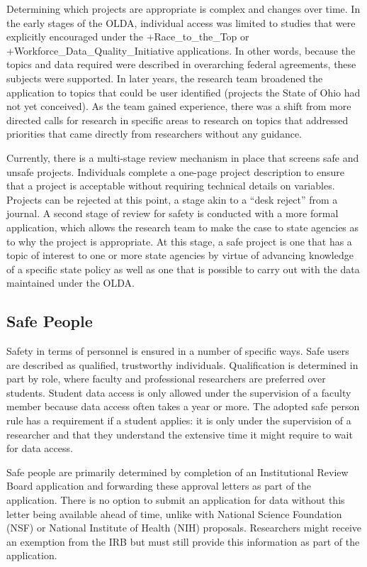 \documentclass[
]{book}
\begin{document}
Determining which projects are appropriate is complex and changes over time. In the early stages of the OLDA, individual access was limited to studies that were explicitly encouraged under the +Race\_to\_the\_Top\textbar{} or +Workforce\_Data\_Quality\_Initiative\textbar{} applications. In other words, because the topics and data required were described in overarching federal agreements, these subjects were supported. In later years, the research team broadened the application to topics that could be user identified (projects the State of Ohio had not yet conceived). As the team gained experience, there was a shift from more directed calls for research in specific areas to research on topics that addressed priorities that came directly from researchers without any guidance.

Currently, there is a multi-stage review mechanism in place that screens safe and unsafe projects. Individuals complete a one-page project description to ensure that a project is acceptable without requiring technical details on variables. Projects can be rejected at this point, a stage akin to a ``desk reject'' from a journal. A second stage of review for safety is conducted with a more formal application, which allows the research team to make the case to state agencies as to why the project is appropriate. At this stage, a safe project is one that has a topic of interest to one or more state agencies by virtue of advancing knowledge of a specific state policy as well as one that is possible to carry out with the data maintained under the OLDA.

\hypertarget{safe-people-1}{%
\subsection{Safe People}\label{safe-people-1}}

Safety in terms of personnel is ensured in a number of specific ways. Safe users are described as qualified, trustworthy individuals. Qualification is determined in part by role, where faculty and professional researchers are preferred over students. Student data access is only allowed under the supervision of a faculty member because data access often takes a year or more. The adopted safe person rule has a requirement if a student applies: it is only under the supervision of a researcher and that they understand the extensive time it might require to wait for data access.

Safe people are primarily determined by completion of an Institutional Review Board application and forwarding these approval letters as part of the application. There is no option to submit an application for data without this letter being available ahead of time, unlike with National Science Foundation (NSF) or National Institute of Health (NIH) proposals. Researchers might receive an exemption from the IRB but must still provide this information as part of the application.
\end{document}
